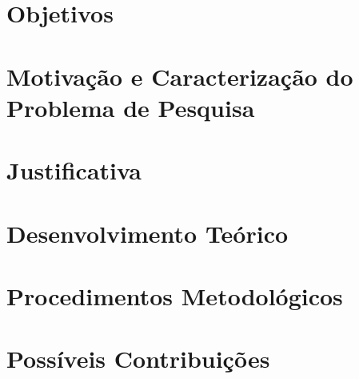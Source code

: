 \documentclass[
	oneside,
	12pt,				%
	a4paper,			%
	english,			%
	brazil,				%
	article
	]{abntex2}
\begin{document}
\section{Objetivos}

\section{Motivação e Caracterização do Problema de Pesquisa}

\section{Justificativa}

\section{Desenvolvimento Teórico}

\section{Procedimentos Metodológicos}

\section{Possíveis Contribuições}




\end{document}
